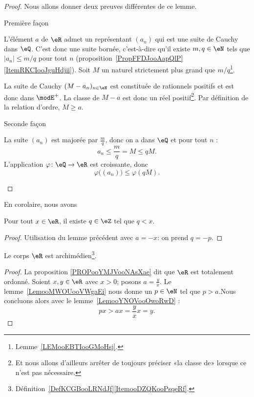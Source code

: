 \begin{proof}
    Nous allons donner deux preuves différentes de ce lemme.
    \begin{subproof}
    \item[Première façon]

        L'élément \( a\) de \( \eR\) admet un représentant \( (a_n)\) qui est une suite de Cauchy dans \( \eQ\). C'est donc une suite bornée, c'est-à-dire qu'il existe \( m,q\in \eN\) tels que \( | a_n |\leq m/q\) pour tout \( n\) (proposition~\ref{PropFFDJooAapQlP}\ref{ItemRKCIooJguHdjii}). Soit \( M\) un naturel strictement plus grand que \( m/q\)\footnote{Lemme~\ref{LEMooEBTIooGMoHsj}.}.

    La suite de Cauchy \( (M-a_n)_{n\in \eN}\) est constituée de rationnels positifs et est donc dans \( \modE^+\). La classe de \( M-a\) est donc un réel positif\footnote{Et nous allons d'ailleurs arrêter de toujours préciser «la classe de» lorsque ce n'est pas nécessaire.}. Par définition de la relation d'ordre, \( M\geq a\).
\item[Seconde façon]

    La suite \( (a_n)\) est majorée par \( \frac{ m }{ q }\), donc on a dans \( \eQ\) et pour tout \( n\) :
    \begin{equation}
        a_n\leq \frac{ m }{ q }=M\leq qM.
    \end{equation}
    L'application \( \varphi\colon \eQ\to \eR\) est croissante, donc
    \begin{equation}
        \varphi\big( (a_n) \big)\leq \varphi(qM).
    \end{equation}
    \end{subproof}
\end{proof}

En corolaire, nous avons
\begin{lemma}      \label{LEMooMWOUooVWgbFi}
    Pour tout \( x\in \eR\), il existe \( q\in \eZ\) tel que \( q < x\).
\end{lemma}
\begin{proof}
    Utilisation du lemme précédent avec \( a = -x \): on prend \( q = -p \).
\end{proof}

\begin{theorem}        \label{ThoooKJTTooCaxEny}
    Le corps \( \eR\) est archimédien\footnote{Définition~\ref{DefKCGBooLRNdJf}\ref{ItemooDZQKooPsqeRf}.}.
\end{theorem}

\begin{proof}
    La proposition \ref{PROPooYMJVooNAsXae} dit que \( \eR\) est totalement ordonné. Soient \( x,y\in \eR\) avec \( x>0\); posons \( a=\frac{ y }{ x }\). Le lemme~\ref{LemooMWOUooVWgaEi} nous donne un \( p \in \eN\) tel que \(p > a\).Nous concluons alors avec le lemme~\ref{LemooYNOVooOwoRwD} :
    \begin{equation}
        px>ax=\frac{ y }{ x }x=y.
    \end{equation}
\end{proof}

